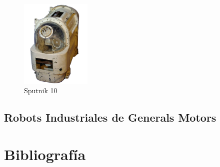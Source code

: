 \documentclass[paper=a4, fontsize=11pt]{scrartcl}
\begin{document}
\begin{figure}[H]
\begin{center}
  \includegraphics[width=0.3\textwidth]{imagenes/s10.jpg}
  \caption{Sputnik 10}
  \label{s2}
\end{center}
\end{figure}





\subsection{Robots Industriales de Generals Motors}




\section{Bibliografía}
\end{document}
